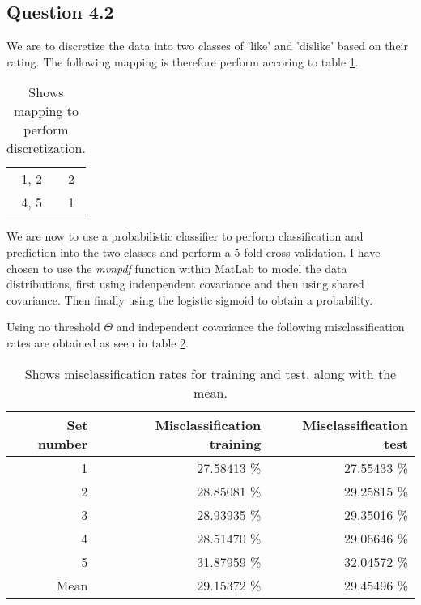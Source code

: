 \subsection*{Question 4.2}

We are to discretize the data into two classes of 'like' and 'dislike'
based on their rating. The following mapping is therefore perform
accoring to table \ref{tab:q42mapping}.

\begin{table}[!htbp]
\centering
\begin{tabular}{c @{$\rightarrow$} c}
1, 2 & 2 \\
4, 5 & 1
\end{tabular}
\caption{Shows mapping to perform discretization.}
\label{tab:q42mapping}
\end{table}

We are now to use a probabilistic classifier to perform classification
and prediction into the two classes and perform a 5-fold cross
validation. I have chosen to use the \textit{mvnpdf} function within
MatLab to model the data distributions, first using indenpendent
covariance and then using shared covariance. Then finally using the
logistic sigmoid to obtain a probability.

Using no threshold $\Theta$ and independent covariance the following
misclassification rates are obtained as seen in table
\ref{tab:q42misctrte}.

\begin{table}[!htbp]
\centering
\begin{tabular}{r r r}
Set number & Misclassification training & Misclassification test \\
\hline
1    & 27.58413 \% & 27.55433 \% \\
2    & 28.85081 \% & 29.25815 \% \\
3    & 28.93935 \% & 29.35016 \% \\
4    & 28.51470 \% & 29.06646 \% \\
5    & 31.87959 \% & 32.04572 \% \\
Mean & 29.15372 \% & 29.45496 \% \\
\end{tabular}
\caption{Shows misclassification rates for training and test, along
  with the mean.}
\label{tab:q42misctrte}
\end{table}

